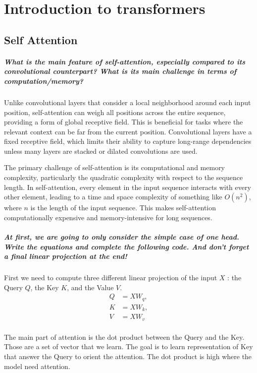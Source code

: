 \chapter{Introduction to transformers}
\section{Self Attention}
\paragraph{What is the main feature of self-attention, especially compared to its convolutional counterpart? What is its main challenge in terms of computation/memory?}
Unlike convolutional layers that consider a local neighborhood around each input position, self-attention can weigh all positions across the entire sequence, providing a form of global receptive field. This is beneficial for tasks where the relevant context can be far from the current position. Convolutional layers have a fixed receptive field, which limits their ability to capture long-range dependencies unless many layers are stacked or dilated convolutions are used. 

The primary challenge of self-attention is its computational and memory complexity, particularly the quadratic complexity with respect to the sequence length. In self-attention, every element in the input sequence interacts with every other element, leading to a time and space complexity of something like $ O(n^2) $, where $n$ is the length of the input sequence. This makes self-attention computationally expensive and memory-intensive for long sequences.

\paragraph{At first, we are going to only consider the simple case of one head. Write the equations and complete the following code. And don't forget a final linear projection at the end!}

First we need to compute three different linear projection of the input $ X $ : the Query $ Q $, the Key $ K $, and the Value $ V $.
\begin{align*}
    Q &= X W_q, \\
    K &= X W_k, \\
    V &= X W_v  \\
\end{align*}


The main part of attention is the dot product between the Query and the Key. Those are a set of vector that we learn. The goal is to learn representation of Key that answer the Query to orient the attention. The dot product is high where the model need attention. 

